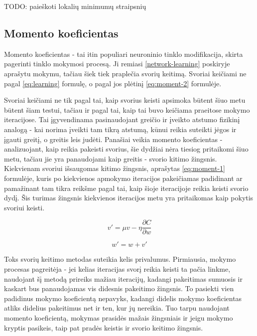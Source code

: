 \documentclass{VUMIFPSbakalaurinis}
\newcommand{\TODO}[1]{
\colorbox{todo-background-color}{TODO: #1}
}
\begin{document}
\TODO{paieškoti lokalių minimumų straipsnių}



\subsection{Momento koeficientas}

Momento koeficientas - tai itin populiari neuroninio tinklo modifikacija, skirta pagerinti tinklo mokymosi procesą.
Ji remiasi \ref{network-learning} poskiryje aprašytu mokymu, tačiau šiek tiek praplečia svorių keitimą.
Svoriai keičiami ne pagal \ref{eq:learning} formulę, o pagal jos plėtinį \ref{eq:moment-2} formulėje.

Svoriai keičiami ne tik pagal tai, kaip svorius keisti apsimoka būtent šiuo metu būtent šiam testui, tačiau ir pagal tai, kaip tai buvo keičiama praeitose mokymo iteracijose.
Tai įgyvendinama pasinaudojant greičio ir įveikto atstumo fizikinį analogą - kai norima įveikti tam tikrą atstumą, kūnui reikia suteikti jėgos ir įgauti greitį, o greitis leis judėti.
Panašiai veikia momento koeficientas - analizuojant, kaip reikia pakeisti svorius, šie dydžiai nėra tiesiog pritaikomi šiuo metu, tačiau jie yra panaudojami kaip greitis - svorio kitimo žingsnis.
Kiekvienam svoriui išsaugomas kitimo žingsnis, aprašytas \ref{eq:moment-1} formulėje, kuris po kiekvienos apmokymo iteracijos pakeičiamas padidinant ar pamažinant tam tikra reikšme pagal tai, kaip šioje iteracijoje reikia keisti svorio dydį.
Šis turimas žingsnis kiekvienos iteracijos metu yra pritaikomas kaip pokytis svoriui keisti.

\begin{equation} \label{eq:moment-1}
v' = \mu v - \eta \frac{\partial C}{\partial w}
\end{equation}

\begin{equation} \label{eq:moment-2}
w' = w + v'
\end{equation}

Toks svorių keitimo metodas suteikia kelis privalumus.
Pirmiausia, mokymo procesas pagreitėja - jei kelias iteracijas svorį reikia keisti ta pačia linkme, naudojant šį metodą prireiks mažiau iteracijų, kadangi pakeitimas sumuosis ir kaskart bus panaudojamas vis didesnis pakeitimo žingsnis.
To pasiekti vien padidinus mokymo koeficientą nepavyks, kadangi didelis mokymo koeficientas atliks didelius pakeitimus net ir ten, kur jų nereikia.
Tuo tarpu naudojant momento koeficientą, mokymas prasidės mažais žingsniais ir jeigu mokymo kryptis pasikeis, taip pat pradės keistis ir svorio keitimo žingsnis.
\end{document}
